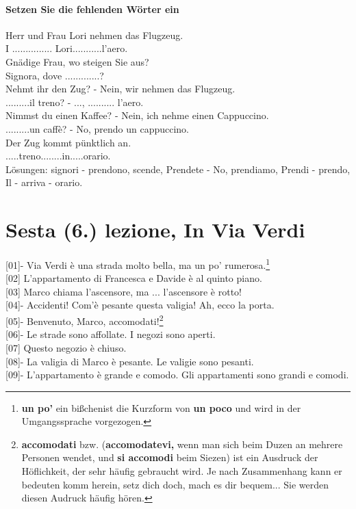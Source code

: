 \documentclass{article}
\begin{document}
\paragraph{Setzen Sie die fehlenden Wörter ein}
Herr und Frau Lori nehmen das Flugzeug.\\
I ............... Lori...........l'aero.\\
Gnädige Frau, wo steigen Sie aus?\\
Signora, dove .............?\\
Nehmt ihr den Zug? - Nein, wir nehmen das Flugzeug.\\
.........il treno? - ..., .......... l'aero.\\
Nimmst du einen Kaffee? - Nein, ich nehme einen Cappuccino.\\
.........un caffè? - No, prendo un cappuccino.\\
Der Zug kommt pünktlich an.\\
.....treno........in.....orario.\\

Lösungen: signori - prendono, scende, Prendete - No, prendiamo, Prendi -
prendo, Il - arriva - orario.

\section{Sesta (6.) lezione, In Via Verdi}
{[01]}- Via Verdi è una strada molto bella, ma un po' rumerosa.\footnote{
    \textbf{un po'} \glqq ein bißchen\grqq ist die Kurzform von \textbf{un poco} und
wird in der Umgangssprache vorgezogen.}\\
{[02]} L'appartamento di Francesca e Davide è al quinto piano.\\
{[03]} Marco chiama l'ascensore, ma ... l'ascensore è rotto!\\
{[04]}- Accidenti! Com'è pesante questa valigia! Ah, ecco la porta.\\
{[05]}- Benvenuto, Marco, accomodati!\footnote{\textbf{accomodati} bzw.
(\textbf{accomodatevi,} wenn man sich beim Duzen an mehrere
Personen wendet, und \textbf{si accomodi} beim Siezen) ist ein Ausdruck der
Höflichkeit, der sehr häufig gebraucht wird. Je nach Zusammenhang kann er
bedeuten \glqq komm herein\grqq, \glqq setz dich doch\grqq, \glqq mach es dir
bequem\grqq... Sie werden diesen Audruck häufig hören.}\\
{[06]}- Le strade sono affollate. I negozi sono aperti.\\
{[07]} Questo negozio è chiuso.\\
{[08]}- La valigia di Marco è pesante. Le valigie sono pesanti.\\
{[09]}- L'appartamento è grande e comodo. Gli appartamenti sono grandi e
comodi.\\
\end{document}
